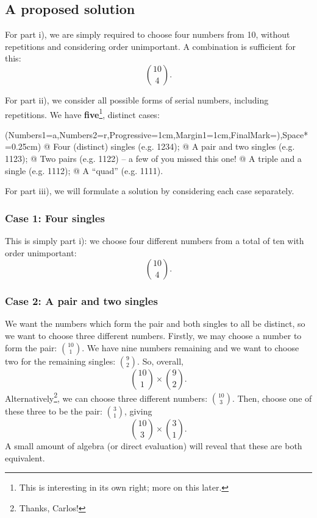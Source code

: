 \documentclass[a4paper,11pt]{article}
\begin{document}
\vspace{1cm}

\subsection*{A proposed solution}
For part i), we are simply required to choose four numbers from 10, without repetitions and considering order unimportant. A combination is sufficient for this: 
$$
\binom{10}{4}.
$$
    
\noindent For part ii), we consider all possible forms of serial numbers, including repetitions. We have \textbf{five}\footnote{This is interesting in its own right; more on this later.}, distinct cases:\\ 

\begin{easylist}[enumerate]
	\ListProperties(Numbers1=a,Numbers2=r,Progressive=1cm,Margin1=1cm,FinalMark={)},Space*=0.25cm)
	@ Four (distinct) singles (e.g. 1234);
	@ A pair and two singles (e.g. 1123);
	@ Two pairs (e.g. 1122) -- a few of you missed this one!
	@ A triple and a single (e.g. 1112);
	@ A ``quad'' (e.g. 1111).\\
\end{easylist}

\pagebreak

\noindent For part iii), we will formulate a solution by considering each case separately.
\subsubsection*{Case 1: Four singles}
This is simply part i): we choose four different numbers from a total of ten with order unimportant:
$$
\binom{10}{4}.
$$

\subsubsection*{Case 2: A pair and two singles}
We want the numbers which form the pair and both singles to all be distinct, so we want to choose three different numbers. Firstly, we may choose a number to form the pair: $\binom{10}{1}$. We have nine numbers remaining and we want to choose two for the remaining singles: $\binom{9}{2}$. So, overall,
$$
\binom{10}{1}\times\binom{9}{2}.
$$
Alternatively\footnote{Thanks, Carlos!}, we can choose three different numbers: $\binom{10}{3}$. Then, choose one of these three to be the pair: $\binom{3}{1}$, giving
$$
\binom{10}{3}\times\binom{3}{1}.
$$
A small amount of algebra (or direct evaluation) will reveal that these are both equivalent.
\end{document}
